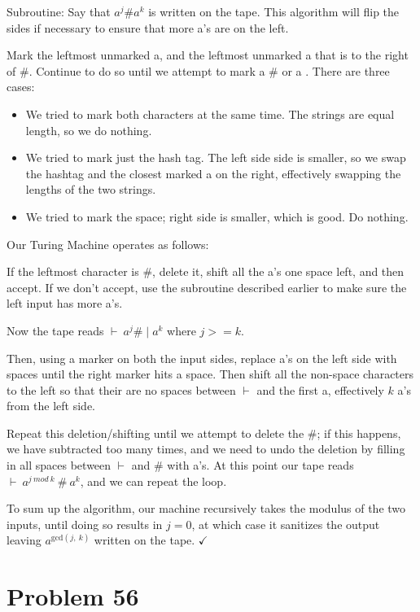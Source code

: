 \documentclass[11pt]{article}
\begin{document}
Subroutine: Say that $a^j \# a^k$ is written on the tape. This algorithm will flip the sides if necessary to ensure that more a's are on the left.

Mark the leftmost unmarked a, and the leftmost unmarked a that is to the right of $\#$. Continue to do so until we attempt to mark a $\#$ or a \textvisiblespace. There are three cases:

\begin{itemize}
	\item We tried to mark both characters at the same time. The strings are equal length, so we do nothing.
	\item We tried to mark just the hash tag. The left side side is smaller, so we swap the hashtag and the closest marked a on the right, effectively swapping the lengths of the two strings.
	\item We tried to mark the space; right side is smaller, which is good. Do nothing.
\end{itemize}


Our Turing Machine operates as follows:

If the leftmost character is $\#$, delete it, shift all the a's one space left, and then accept. If we don't accept, use the subroutine described earlier to make sure the left input has more a's. 

Now the tape reads $\vdash \ a^j \# \mid a^k$ where $j >= k$.


Then, using a marker on both the input sides, replace a's on the left side with spaces until the right marker hits a space. Then shift all the non-space characters to the left so that their are no spaces between $\vdash$ and the first a, effectively $k$ a's from the left side.

Repeat this deletion/shifting until we attempt to delete the $\#$; if this happens, we have subtracted too many times, and we need to undo the deletion by filling in all spaces between $\vdash$ and $\#$ with a's. At this point our tape reads $\vdash \  a^{j\ mod\ k}\ \#\ a^{k}$, and we can repeat the loop.

To sum up the algorithm, our machine recursively takes the modulus of the two inputs, until doing so results in $j=0$, at which case it sanitizes the output leaving $a^{\text{gcd}( j,\ k)}$ written on the tape. $\checkmark$


\section*{Problem 56}
\end{document}
